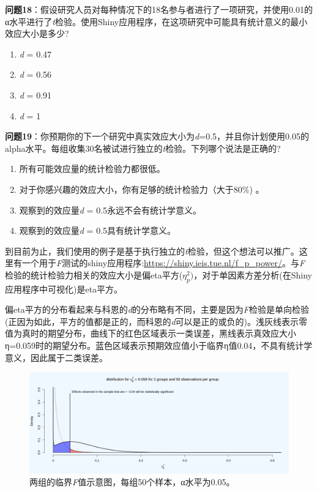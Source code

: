 \documentclass[
  letterpaper,
  DIV=11,
  numbers=noendperiod]{scrreprt}
\providecommand{\tightlist}{%
  \setlength{\itemsep}{0pt}\setlength{\parskip}{0pt}}\usepackage{longtable,booktabs,array}
\begin{document}
\textbf{问题18}：假设研究人员对每种情况下的18名参与者进行了一项研究，并使用0.01的α水平进行了\emph{t}检验。使用Shiny应用程序，在这项研究中可能具有统计意义的最小效应大小是多少?

\begin{enumerate}
\def\labelenumi{\Alph{enumi})}
\tightlist
\item
  \emph{d} = 0.47
\item
  \emph{d} = 0.56
\item
  \emph{d} = 0.91
\item
  \emph{d} = 1
\end{enumerate}

\textbf{问题19}：你预期你的下一个研究中真实效应大小为\emph{d}=0.5，并且你计划使用0.05的alpha水平。每组收集30名被试进行独立的\emph{t}检验。下列哪个说法是正确的?

\begin{enumerate}
\def\labelenumi{\Alph{enumi})}
\tightlist
\item
  所有可能效应量的统计检验力都很低。
\item
  对于你感兴趣的效应大小，你有足够的统计检验力（大于80\%) 。
\item
  观察到的效应量\emph{d} = 0.5永远不会有统计学意义。
\item
  观察到的效应量\emph{d} = 0.5具有统计学意义。
\end{enumerate}

到目前为止，我们使用的例子是基于执行独立的\emph{t}检验，但这个想法可以推广。这里有一个用于\emph{F}测试的shiny应用程序:\url{https://shiny.ieis.tue.nl/f_p_power/}。与\emph{F}检验的统计检验力相关的效应大小是偏eta平方(\(\eta_{p}^{2})\)，对于单因素方差分析(在Shiny应用程序中可视化)是eta平方。

偏eta平方的分布看起来与科恩的\emph{d}的分布略有不同，主要是因为\emph{F}检验是单向检验(正因为如此，平方的值都是正的，而科恩的\emph{d}可以是正的或负的)。浅灰线表示零值为真时的期望分布，曲线下的红色区域表示一类误差，黑线表示真效应大小η=0.059时的期望分布。蓝色区域表示预期效应值小于临界η值0.04，不具有统计学意义，因此属于二类误差。

\begin{figure}

{\centering \includegraphics[width=1\textwidth,height=\textheight]{images/7f6d17dc07bdc9e95ea8944d78b16d7c.png}

}

\caption{\label{fig-critf}两组的临界\emph{F}值示意图，每组50个样本，α水平为0.05。}

\end{figure}
\end{document}
